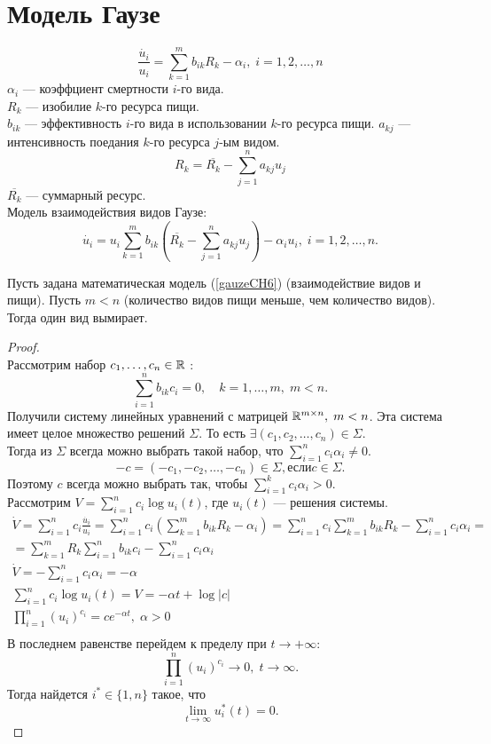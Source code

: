 \section{Модель Гаузе}
\begin{equation}
\dfrac{\dot{u_i}}{u_i} = \sum_{k=1}^{m} b_{ik} R_k - \alpha_i, \; i = 1, 2, \dots, n
\end{equation}
$\alpha_i$ --- коэффциент смертности $i$-го вида.\\
$R_k$ --- изобилие $k$-го ресурса пищи.\\
$b_{ik}$ --- эффективность $i$-го вида в использовании $k$-го ресурса пищи.
$a_{kj}$ --- интенсивность поедания $k$-го ресурса $j$-ым видом.
\begin{equation}
R_k = \overline{R_k} - \sum_{j = 1}^{n} a_{kj} u_j
\end{equation}
$\overline{R_k}$ --- суммарный ресурс.\\[8pt]
Модель взаимодействия видов Гаузе:
\begin{equation}\label{gauzeCH6}
\dot{u_i} = u_i \sum_{k=1}^{m} b_{ik}(\overline{R_k} - \sum_{j = 1}^{n} a_{kj} u_j) - \alpha_i u_i, \; i = 1, 2, \dots, n.
\end{equation}
\begin{theorem}[Гаузе]
Пусть задана математическая модель (\ref{gauzeCH6}) (взаимодействие видов и пищи). Пусть $m<n$ (количество видов пищи меньше, чем количество видов). Тогда один вид вымирает.
\end{theorem}
\begin{proof}\\
Рассмотрим набор $c_1, \dots, c_n \in \mathbb{R}$ : 
$$\sum_{i=1}^{n} b_{ik} c_i = 0, \quad k = 1,\dots, m, \; m<n.$$
Получили систему линейных уравнений с матрицей $\mathbb{R}^{m\times n}, \; m<n$. Эта система имеет целое множество решений $\Sigma$. То есть $\exists (c_1, c_2, \dots, c_n) \in \Sigma$.\\
Тогда из $\Sigma$ всегда можно выбрать такой набор, что $\sum_{i=1}^{n} c_i \alpha_i \neq 0$.
$$-c = (-c_1, -c_2, \dots, -c_n) \in \Sigma, \text{если} c \in \Sigma.$$
Поэтому $c$ всегда можно выбрать так, чтобы $\sum_{i=1}^{k}c_i \alpha_i > 0.$\\
Рассмотрим $V = \sum_{i=1}^{n} c_i \log u_i(t)$, где $u_i(t)$ --- решения системы.
\begin{gather*}
\dot{V} = \sum_{i=1}^{n} c_i \frac{\dot{u_i}}{u_i} = \sum_{i=1}^{n} c_i \left( \sum_{k=1}^{m} b_{ik} R_k - \alpha_i \right) = \sum_{i = 1}^{n} c_i \sum_{k = 1}^{m} b_{ik} R_k - \sum_{i = 1}^{n} c_i \alpha_i =\\
= \sum_{k = 1}^{m} R_k \sum_{i = 1}^{n} b_{ik} c_i - \sum_{i = 1}^{n} c_i \alpha_i\\
\dot{V} = - \sum_{i = 1}^{n} c_i \alpha_i = -\alpha\\
\sum_{i=1}^{n} c_i \log u_i(t) = V = - \alpha t + \log|c|\\
\prod_{i = 1}^{n}(u_i)^{c_i} = c e^{-\alpha t}, \; \alpha>0\\
\end{gather*}
В последнем равенстве перейдем к пределу при $t \to +\infty$:
$$\prod_{i=1}^{n}(u_i)^{c_i} \to 0, \; t\to \infty. $$
Тогда найдется $i^* \in \{1, n\}$ такое, что 
$$\lim_{t \to \infty} u_i^*(t) = 0.$$
\end{proof}

